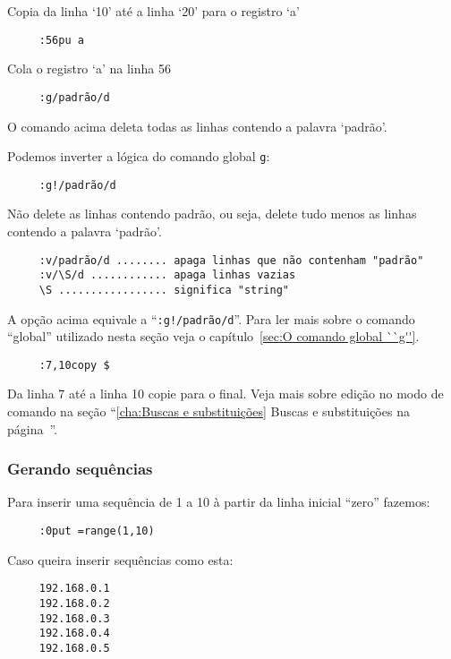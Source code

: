 Copia da linha `10' até a linha `20' para o registro `a'

\begin{verbatim}
     :56pu a
\end{verbatim}

Cola o registro `a' na linha 56

\begin{verbatim}
     :g/padrão/d
\end{verbatim}

O comando acima deleta todas as linhas contendo a palavra `padrão'.

Podemos inverter a lógica do comando global \verb+g+:

\begin{verbatim}
     :g!/padrão/d
\end{verbatim}

Não delete as linhas contendo padrão, ou seja, delete tudo menos as linhas
contendo a palavra `padrão'. 

\begin{verbatim}
     :v/padrão/d ........ apaga linhas que não contenham "padrão"
     :v/\S/d ............ apaga linhas vazias
     \S ................. significa "string"
\end{verbatim}

A opção acima equivale a ``\verb+:g!/padrão/d+''.  Para ler mais sobre
o comando ``global'' utilizado nesta seção veja o capítulo~\ref{sec:O comando global ``g''}.

\begin{verbatim}
     :7,10copy $
\end{verbatim}

Da linha 7 até a linha 10 copie para o final. {\Large {}}
Veja mais sobre edição no modo de comando na seção ``\ref{cha:Buscas e
substituições} Buscas e substituições na página~\pageref{cha:Buscas e substituições}''.

\subsubsection{Gerando sequências}
Para inserir uma sequência de 1 a 10 à partir da linha inicial ``zero'' fazemos:

\begin{verbatim}
     :0put =range(1,10)
\end{verbatim}

Caso queira inserir sequências como esta:

\begin{verbatim}
     192.168.0.1
     192.168.0.2
     192.168.0.3
     192.168.0.4
     192.168.0.5
\end{verbatim}

